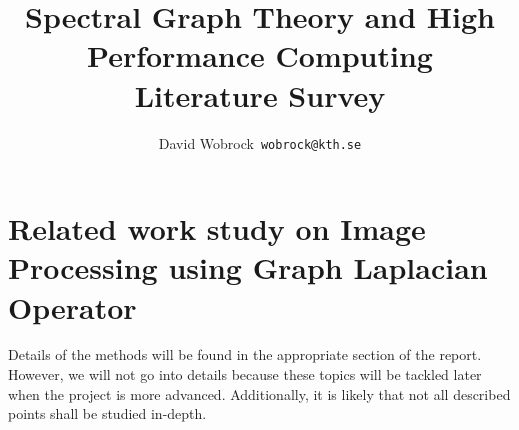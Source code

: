 \documentclass[]{article}
\title{Spectral Graph Theory and High Performance Computing \\ Literature Survey}
\author{David Wobrock\ \texttt{wobrock@kth.se}}
\begin{document}
\maketitle

\section{Related work study on Image Processing using Graph Laplacian Operator}



Details of the methods will be found in the appropriate section of the report.
However, we will not go into details because these topics will be tackled later when the project is more advanced.
Additionally, it is likely that not all described points shall be studied in-depth.

\clearpage
\printbibliography
\end{document}
